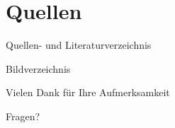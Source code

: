 
\section{Quellen}

\begin{frame}[allowframebreaks]{Quellen- und Literaturverzeichnis}
    \printbibliography[heading=none, notkeyword={image}, notkeyword={online}]   
\end{frame}


\begin{frame}[allowframebreaks]{Bildverzeichnis}
    \printbibliography[heading=none, keyword={image}]
\end{frame}

\begin{frame}{Vielen Dank für Ihre Aufmerksamkeit}
    \begin{center}
        Fragen?
    \end{center}
\end{frame}
